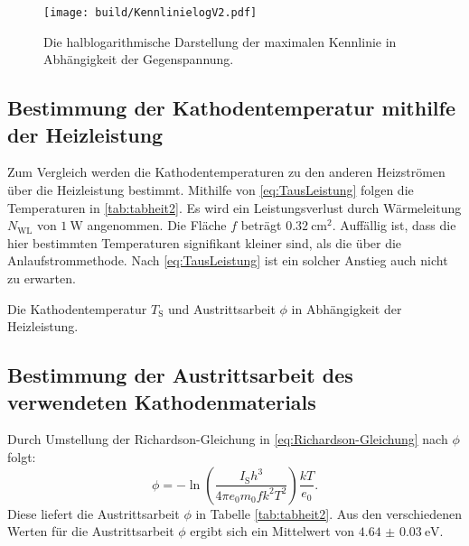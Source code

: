  \begin{figure}
  \centering
  \caption{Die halblogarithmische Darstellung der maximalen Kennlinie in Abhängigkeit der Gegenspannung.}
  \texttt{[image: build/KennlinielogV2.pdf]}
  \label{fig:Graphlog3}
 \end{figure}

\subsection{Bestimmung der Kathodentemperatur mithilfe der Heizleistung}
Zum Vergleich werden die Kathodentemperaturen zu den anderen Heizströmen über die Heizleistung bestimmt.
Mithilfe von \ref{eq:TausLeistung} folgen die Temperaturen in \ref{tab:tabheit2}. Es wird ein Leistungsverlust durch Wärmeleitung $N_\text{WL}$ von $\SI{1}{\watt}$ angenommen.
Die Fläche $f$ beträgt $\SI{0.32}{\centi\meter\squared}$.
Auffällig ist, dass die hier bestimmten Temperaturen signifikant kleiner sind,
als die über die Anlaufstrommethode. Nach \ref{eq:TausLeistung} ist ein solcher Anstieg auch nicht zu erwarten.

\begin{table}
 \centering
 \caption{Die Kathodentemperatur $T_\text{S}$ und Austrittsarbeit $\phi$ in Abhängigkeit der Heizleistung.}
 
 \label{tab:tabheit2}
\end{table}

\subsection{Bestimmung der Austrittsarbeit des verwendeten Kathodenmaterials}
Durch Umstellung der Richardson-Gleichung in \ref{eq:Richardson-Gleichung} nach
$\phi$ folgt:
\begin{equation}
  \phi = -\ln\left(\frac{I_\text{S} h^3}{4\pi e_0 m_0 f k^2 T^2}\right) \frac{k T}{e_0} \text{.}
\end{equation}
Diese liefert die Austrittsarbeit $\phi$ in Tabelle \ref{tab:tabheit2}. Aus den verschiedenen Werten für die Austrittsarbeit $\phi$ ergibt sich ein Mittelwert von $\SI{4.64(3)}{\electronvolt}$.
